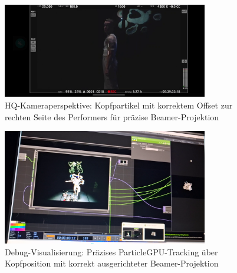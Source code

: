 \begin{figure}[htbp]
    \centering
    \includegraphics[width=0.8\textwidth,height=0.4\textheight,keepaspectratio]{images/HQCameraHeadtrackingVisibleWithBubblesOffsetCorrectlyFromHQCameraViewToAppearOnRightSideOfHead.png}
    \caption{HQ-Kameraperspektive: Kopfpartikel mit korrektem Offset zur rechten Seite des Performers für präzise Beamer-Projektion}
    \label{fig:headtracking_hq_kamera_offset}
\end{figure}

\begin{figure}[htbp]
    \centering
    \includegraphics[width=0.8\textwidth,height=0.4\textheight,keepaspectratio]{images/HeadTrackingPerspectiveTouchDesignerWithVisualsOverlayedAboveDebugCompToSeeaccurateTrackingOfParticleGPUaboveHeadWithReallifeBeamerProjectionCorrectlyPlaced.png}
    \caption{Debug-Visualisierung: Präzises ParticleGPU-Tracking über Kopfposition mit korrekt ausgerichteter Beamer-Projektion}
    \label{fig:headtracking_debug_overlay}
\end{figure}

